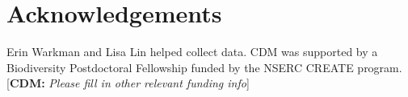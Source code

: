\documentclass[11pt, oneside]{article}
\newcommand{\cdm}[1]{{ \color{magenta} [{\bf{CDM:}} {\em#1}]}} %
\begin{document}









\section*{Acknowledgements}
Erin Warkman and Lisa Lin helped collect data. CDM was supported by a Biodiversity Postdoctoral Fellowship funded by the NSERC CREATE program. \cdm{Please fill in other relevant funding info}
\end{document}

